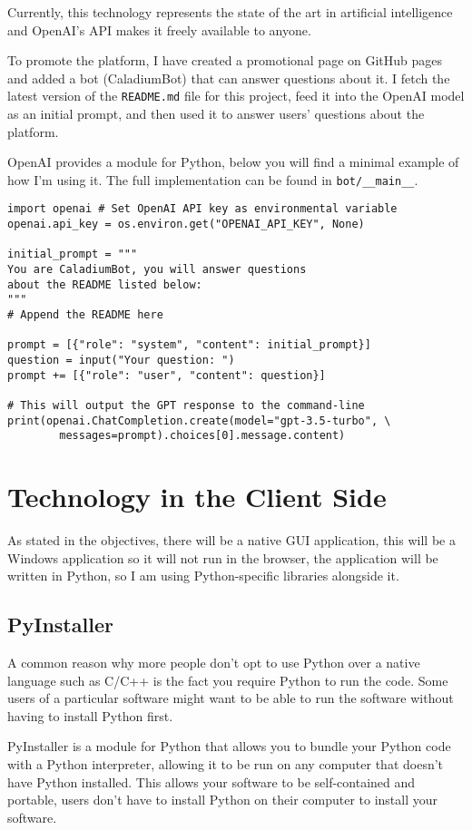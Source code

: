 Currently, this technology represents the state of the art in
artificial intelligence and OpenAI's API makes it freely available to anyone.

To promote the platform, I have created a promotional page on
GitHub pages and added a bot (CaladiumBot) that can answer questions about it.
I fetch the latest version of the \texttt{README.md} file for
this project, feed it into the OpenAI model as an initial prompt,
and then used it to answer users' questions about the platform.

OpenAI provides a module for Python,
below you will find a minimal example of how I'm using it.
The full implementation can be found in \texttt{bot/\_\_main\_\_}.

\begin{lstlisting}
import openai # Set OpenAI API key as environmental variable
openai.api_key = os.environ.get("OPENAI_API_KEY", None)

initial_prompt = """
You are CaladiumBot, you will answer questions
about the README listed below:
"""
# Append the README here

prompt = [{"role": "system", "content": initial_prompt}]
question = input("Your question: ")
prompt += [{"role": "user", "content": question}]

# This will output the GPT response to the command-line
print(openai.ChatCompletion.create(model="gpt-3.5-turbo", \
        messages=prompt).choices[0].message.content)
\end{lstlisting}

\section{Technology in the Client Side}
As stated in the objectives, there will be a native GUI application,
this will be a Windows application so it will not run in the browser,
the application will be written in Python,
so I am using Python-specific libraries alongside it.

\subsection{PyInstaller}
A common reason why more people don't opt to use Python over a
native language such as C/C++ is the fact you require Python
to run the code.
Some users of a particular software might
want to be able to run the software without having to install Python first.

PyInstaller is a module for Python that allows you to bundle your
Python code with a Python interpreter, allowing it to be run on any computer
that doesn't have Python installed.
This allows your software to be self-contained and portable,
users don't have to install Python on their computer to install your software.


